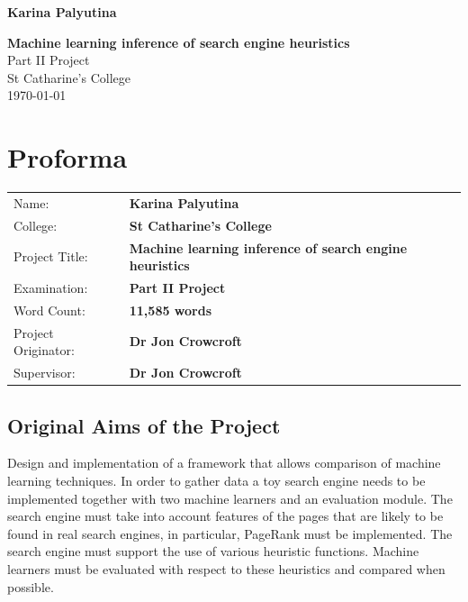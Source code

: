 \documentclass[12pt,notitlepage,twoside]{scrreprt}
\begin{document}





\pagestyle{empty}

\hfill{\LARGE \bf Karina Palyutina}

\vspace*{60mm}
\begin{center}
\Huge
{\bf Machine learning inference of search engine heuristics} \\
\vspace*{5mm}
Part II Project \\
\vspace*{5mm}
St Catharine's College \\
\vspace*{5mm}
\today  %
\end{center}

\cleardoublepage


\setcounter{page}{1}
\pagestyle{plain}

\chapter*{Proforma}

{\large
\begin{tabular}{ll}
Name:               & \bf Karina Palyutina                       \\
College:            & \bf St Catharine's College                     \\
Project Title:      & \bf Machine learning inference of search engine heuristics \\
Examination:        & \bf Part II Project        \\
Word Count:         & \bf 11,585 words     \\
Project Originator: & \bf Dr Jon Crowcroft                    \\
Supervisor:         & \bf Dr Jon Crowcroft                  \\ 
\end{tabular}
}


\newpage


\section*{Original Aims of the Project}
Design and implementation of a framework that allows comparison of machine learning
techniques. In order to gather data a toy search engine needs to be implemented together
with two machine learners and an evaluation module. The search engine must take into account
features of the pages that are likely to be found in real search engines, in particular,
PageRank must be implemented. The search engine must support the use of various heuristic
functions. Machine learners must be evaluated with respect to these heuristics and
compared when possible. 
\end{document}
